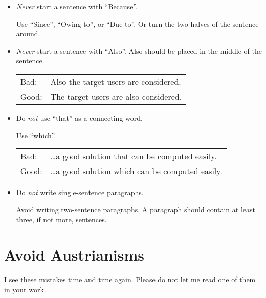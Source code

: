 \begin{itemize}
\item \emph{Never} start a sentence with ``Because''.

Use ``Since'', ``Owing to'', or ``Due to''. Or turn the two
halves of the sentence around.




\item \emph{Never} start a sentence with ``Also''. Also should
be placed in the middle of the sentence.

\begin{tabular}{lp{0.9\hsize}}
Bad:  & Also the target users are considered. \\
Good: & The target users are also considered. \\
\end{tabular}



\item Do \emph{not} use ``that'' as a connecting word.

Use ``which''.

\begin{tabular}{lp{0.9\hsize}}
Bad:  & \ldots a good solution that can be computed easily.  \\
Good: & \ldots a good solution which can be computed easily.  \\
\end{tabular}




\item Do \emph{not} write single-sentence paragraphs. 

Avoid writing two-sentence paragraphs. A paragraph should contain at
least three, if not more, sentences.


\end{itemize}











\section{Avoid Austrianisms}
\label{sec:Austrianisms}


I see these mistakes time and time again. Please do not
let me read one of them in your work.



